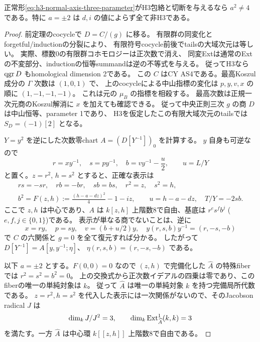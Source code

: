 \begin{theorem}[節点判別値の全パラメータ排除]
\label{thm:h3-order2-normal-axis-nodal-exclusion}
正常形\eqref{eq:h3-normal-axis-three-parameter}がH3包絡と切断を与えるなら
$a^2\ne4$ である。特に $a=\pm2$ は $d,i$ の値によらず全て非H3である。
\end{theorem}
\begin{proof}
前定理のcocycleで $D=C/(g)$ に移る。
有限群の同変化とforgetful/inductionの分裂により、
有限符号cocycle前後でtailsの大域次元は等しい。
実際、標数0の有限群コホモロジーは正次数で消え、
同変Extは通常のExtの不変部分、inductionの恒等summandは逆の不等式を与える。
従ってH3なら $\operatorname{qgr} D$ もhomological dimension 2である。
この $C$ はCY AS4である。最高Koszul成分の $\Gamma$ 次数は $(1,0,1)$ で、
上のcocycleによる中山指標の変化は $p,y,v,x$ の順に $(1,-1,-1,-1)$。
これは元の $\mu_B$ の指標を相殺する。
最高次数は正規一次元商のKoszul解消に $x$ を加えても確認できる。
従って中央正則三次 $g$ の商 $D$ は中山恒等、parameter 1であり、
H3を仮定したこの有限大域次元のtailsでは $S_D=(-1)[2]$ となる。

$Y=y^2$ を逆にした次数零chart $A=(D[Y^{-1}])_0$ を計算する。
$y$ 自身も可逆なので
\[
 r=xy^{-1},\quad s=py^{-1},\quad
 b=vy^{-1}-\frac u2,\qquad u=L/Y
\]
と置く。$z=r^2$, $h=s^2$ とすると、正確な表示は
\begin{equation}\label{eq:h3-normal-axis-nodal-chart}
 \begin{gathered}
 rs=-sr,\quad rb=-br,\quad sb=bs,\quad r^2=z,\quad s^2=h,\\
 b^2=F(z,h):=\frac{(h-a-dz)^2}{4}-1-iz,
 \qquad u=h-a-dz,\quad T/Y=-2sb.
 \end{gathered}
\end{equation}
ここで $z,h$ は中心であり、$A$ は $k[z,h]$ 上階数8で自由、基底は
$r^e s^f b^j$ ($e,f,j\in\{0,1\}$)である。
表示が単なる商でないことは、逆に
\[
 x=ry,\quad p=sy,\quad v=(b+u/2)y,\quad
 y(r,s,b)y^{-1}=(r,-s,-b)
\]
で $C$ の六関係と $g=0$ を全て復元すれば分かる。
したがって $D[Y^{-1}]=A[y,y^{-1};\eta]$、
$\eta(r,s,b)=(r,-s,-b)$ である。

以下 $a=\pm2$ とする。$F(0,0)=0$ なので
$(z,h)$ で完備化した $\widehat A$ の特殊fiberでは $r^2=s^2=b^2=0$。
上の交換式から正次数イデアルの四乗は零であり、このfiberの唯一の単純対象は $k$。
従って $\widehat A$ は唯一の単純対象 $k$ を持つ完備局所代数である。
$z=r^2,h=s^2$ を代入した表示には一次関係がないので、そのJacobson radical $J$ は
\[
 \dim_k J/J^2=3,\qquad \dim_k\operatorname{Ext}^1_{\widehat A}(k,k)=3
\]
を満たす。一方 $\widehat A$ は中心環 $k[[z,h]]$ 上階数8で自由である。


\end{proof}
